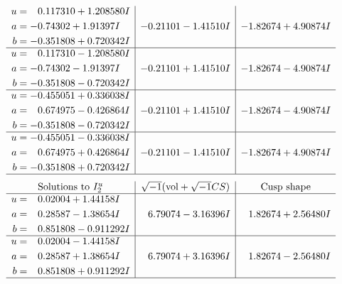 \documentclass[1p]{elsarticle_modified}
\theoremstyle{definition}
\newcommand{\I}{\sqrt{-1}}
\begin{document}
$$\begin{array}{c|c|c}
\begin{aligned}
u &= \phantom{-}0.117310 + 1.208580 I \\
a &= -0.74302 + 1.91397 I \\
b &= -0.351808 + 0.720342 I\end{aligned}
 & -0.21101 - 1.41510 I & -1.82674 + 4.90874 I \\ \hline\begin{aligned}
u &= \phantom{-}0.117310 - 1.208580 I \\
a &= -0.74302 - 1.91397 I \\
b &= -0.351808 - 0.720342 I\end{aligned}
 & -0.21101 + 1.41510 I & -1.82674 - 4.90874 I \\ \hline\begin{aligned}
u &= -0.455051 + 0.336038 I \\
a &= \phantom{-}0.674975 - 0.426864 I \\
b &= -0.351808 - 0.720342 I\end{aligned}
 & -0.21101 + 1.41510 I & -1.82674 - 4.90874 I \\ \hline\begin{aligned}
u &= -0.455051 - 0.336038 I \\
a &= \phantom{-}0.674975 + 0.426864 I \\
b &= -0.351808 + 0.720342 I\end{aligned}
 & -0.21101 - 1.41510 I & -1.82674 + 4.90874 I\\
 \hline 
 \end{array}$$\newpage$$\begin{array}{c|c|c}  
\text{Solutions to }I^u_{2}& \I (\text{vol} + \sqrt{-1}CS) & \text{Cusp shape}\\
 \hline 
\begin{aligned}
u &= \phantom{-}0.02004 + 1.44158 I \\
a &= \phantom{-}0.28587 - 1.38654 I \\
b &= \phantom{-}0.851808 - 0.911292 I\end{aligned}
 & \phantom{-}6.79074 - 3.16396 I & \phantom{-}1.82674 + 2.56480 I \\ \hline\begin{aligned}
u &= \phantom{-}0.02004 - 1.44158 I \\
a &= \phantom{-}0.28587 + 1.38654 I \\
b &= \phantom{-}0.851808 + 0.911292 I\end{aligned}
 & \phantom{-}6.79074 + 3.16396 I & \phantom{-}1.82674 - 2.56480 I\\
 \hline 
 \end{array}$$\newpage\newpage\renewcommand{\arraystretch}{1}
\end{document}
